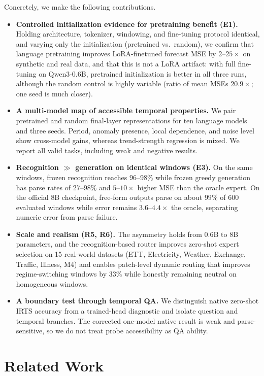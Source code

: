 \documentclass{article}
\begin{document}
Concretely, we make the following contributions.
\begin{itemize}
  \item \textbf{Controlled initialization evidence for pretraining benefit (E1).}
  Holding architecture, tokenizer, windowing, and fine-tuning protocol
  identical, and varying only the initialization (pretrained vs.\ random), we
  confirm that language pretraining improves LoRA-finetuned forecast MSE by
  $2$--$25\times$ on synthetic and real data, and that this is not a LoRA
  artifact: with full fine-tuning on Qwen3-0.6B, pretrained initialization is
  better in all three runs, although the random control is highly variable
  (ratio of mean MSEs $20.9\times$; one seed is much closer).
  \item \textbf{A multi-model map of accessible temporal properties.}
  We pair pretrained and random final-layer representations for ten language
  models and three seeds.  Period, anomaly presence, local dependence, and
  noise level show cross-model gains, whereas trend-strength regression is
  mixed.  We report all valid tasks, including weak and negative results.
  \item \textbf{Recognition $\gg$ generation on identical windows (E3).}
  On the same windows, frozen recognition reaches $96$--$98\%$ while frozen
  greedy generation has parse rates of $27$--$98\%$ and $5$--$10\times$ higher
  MSE than the oracle expert.  On the official 8B checkpoint, free-form outputs
  parse on about $99\%$ of 600 evaluated windows while error remains
  $3.6$--$4.4\times$ the oracle, separating numeric error from parse failure.
  \item \textbf{Scale and realism (R5, R6).}  The asymmetry holds from
  $0.6$B to $8$B parameters, and the recognition-based router improves
  zero-shot expert selection on 15 real-world datasets (ETT, Electricity,
  Weather, Exchange, Traffic, Illness, M4) and enables patch-level dynamic
  routing that improves regime-switching windows by $33\%$ while honestly
  remaining neutral on homogeneous windows.
  \item \textbf{A boundary test through temporal QA.}  We distinguish native
  zero-shot IRTS accuracy from a trained-head diagnostic and isolate question
  and temporal branches.  The corrected one-model native result is weak and
  parse-sensitive, so we do not treat probe accessibility as QA ability.
\end{itemize}

\section{Related Work}\label{sec:related}
\end{document}
